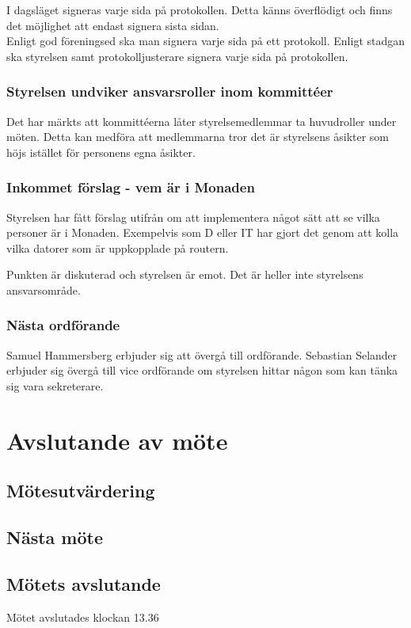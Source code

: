 \documentclass[protokoll]{dvd}
\begin{document}
I dagsläget signeras varje sida på protokollen. Detta känns överflödigt och finns det möjlighet att endast signera sista sidan.
\\
Enligt god föreningsed ska man signera varje sida på ett protokoll. Enligt stadgan ska styrelsen samt protokolljusterare signera varje sida på protokollen. 

\subsubsection{Styrelsen undviker ansvarsroller inom kommittéer}

Det har märkts att kommittéerna låter styrelsemedlemmar ta huvudroller under möten. Detta kan medföra att medlemmarna tror det är styrelsens åsikter som höjs istället för personens egna åsikter. 


\subsubsection{Inkommet förslag - vem är i Monaden}

Styrelsen har fått förslag utifrån om att implementera något sätt att se vilka personer är i Monaden. Exempelvis som D eller IT har gjort det genom att kolla vilka datorer som är uppkopplade på routern.

Punkten är diskuterad och styrelsen är emot. Det är heller inte styrelsens ansvarsområde.


\subsubsection{Nästa ordförande}

Samuel Hammersberg erbjuder sig att övergå till ordförande. Sebastian Selander erbjuder sig övergå till vice ordförande om styrelsen hittar någon som kan tänka sig vara sekreterare.

\newpage






\section{Avslutande av möte}

\subsection{Mötesutvärdering}

\subsection{Nästa möte}

\subsection{Mötets avslutande}

Mötet avslutades klockan 13.36

\styrelsesignaturer
\end{document}
